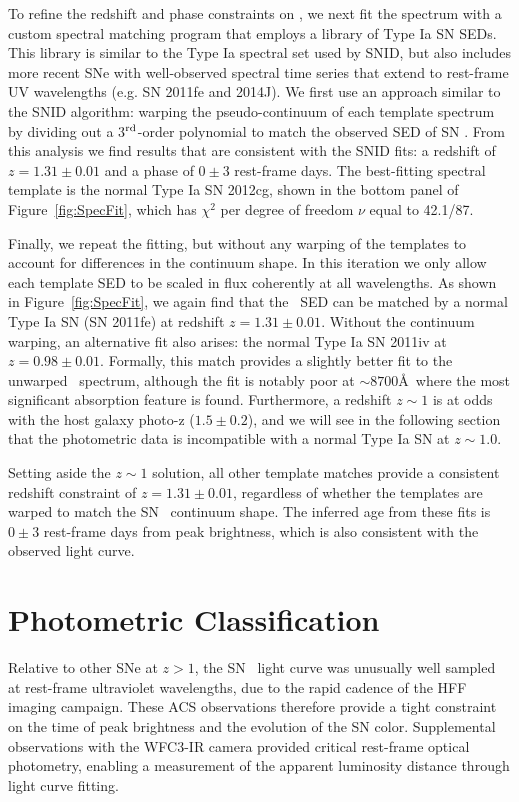 To refine the redshift and phase constraints on \tomas, we next fit
the spectrum with a custom spectral matching program that employs a
library of Type Ia SN SEDs.  This library is similar to the Type Ia
spectral set used by SNID, but also includes more recent SNe with
well-observed spectral time series that extend to rest-frame UV
wavelengths (e.g. SN 2011fe and 2014J).  We first use an approach
similar to the SNID algorithm: warping the pseudo-continuum of each
template spectrum by dividing out a 3$^{\rm rd}$-order polynomial to
match the observed SED of SN \tomas.  From this analysis we find
results that are consistent with the SNID fits: a redshift of
$z=1.31\pm0.01$ and a phase of $0\pm3$ rest-frame days. The
best-fitting spectral template is the normal Type Ia SN 2012cg, shown
in the bottom panel of Figure~\ref{fig:SpecFit}, which has $\chi^2$
per degree of freedom $\nu$ equal to 42.1/87.

Finally, we repeat the fitting, but without any warping of the
templates to account for differences in the continuum shape.  In this
iteration we only allow each template SED to be scaled in flux
coherently at all wavelengths.  As shown in Figure~\ref{fig:SpecFit},
we again find that the \tomas\ SED can be matched by a normal Type Ia
SN (SN 2011fe) at redshift $z=1.31\pm0.01$.  Without the continuum
warping, an alternative fit also arises: the normal Type Ia SN 2011iv
at $z=0.98\pm0.01$. Formally, this match provides a slightly better
fit to the unwarped \tomas\ spectrum, although the fit is notably poor
at $\sim8700$\AA\ where the most significant absorption feature is
found. Furthermore, a redshift $z\sim1$ is at odds with the host
galaxy photo-z ($1.5\pm0.2$), and we will see in the following section
that the photometric data is incompatible with a normal Type Ia SN at
$z\sim1.0$.

Setting aside the $z\sim1$ solution, all other template matches
provide a consistent redshift constraint of $z=1.31\pm0.01$,
regardless of whether the templates are warped to match the SN \tomas\
continuum shape.  The inferred age from these fits is $0\pm3$
rest-frame days from peak brightness, which is also consistent with
the observed light curve.


\section{Photometric Classification}
\label{sec:PhotometricClassification}

Relative to other SNe at $z>1$, the SN \tomas\ light curve was
unusually well sampled at rest-frame ultraviolet wavelengths, due to
the rapid cadence of the HFF imaging campaign. These ACS observations
therefore provide a tight constraint on the time of peak brightness
and the evolution of the SN color.  Supplemental observations with the
WFC3-IR camera provided critical rest-frame optical photometry,
enabling a measurement of the apparent luminosity distance through
light curve fitting.

